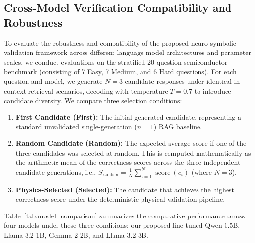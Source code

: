 \documentclass[a4paper,fleqn]{cas-sc}
\begin{document}
\subsection{Cross-Model Verification Compatibility and Robustness}
To evaluate the robustness and compatibility of the proposed neuro-symbolic validation framework across different language model architectures and parameter scales, we conduct evaluations on the stratified 20-question semiconductor benchmark (consisting of 7 Easy, 7 Medium, and 6 Hard questions). For each question and model, we generate $N=3$ candidate responses under identical in-context retrieval scenarios, decoding with temperature $T=0.7$ to introduce candidate diversity. We compare three selection conditions:
\begin{enumerate}
    \item \textbf{First Candidate (First):} The initial generated candidate, representing a standard unvalidated single-generation ($n=1$) RAG baseline.
    \item \textbf{Random Candidate (Random):} The expected average score if one of the three candidates was selected at random. This is computed mathematically as the arithmetic mean of the correctness scores across the three independent candidate generations, i.e., $S_{\mathrm{random}} = \frac{1}{N} \sum_{i=1}^{N} \operatorname{score}(c_i)$ (where $N=3$).
    \item \textbf{Physics-Selected (Selected):} The candidate that achieves the highest correctness score under the deterministic physical validation pipeline.
\end{enumerate}
Table~\ref{tab:model_comparison} summarizes the comparative performance across four models under these three conditions: our proposed fine-tuned Qwen-0.5B, Llama-3.2-1B, Gemma-2-2B, and Llama-3.2-3B.
\end{document}
